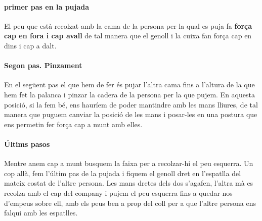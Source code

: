 \documentclass[a4paper]{article}
\begin{document}
\paragraph{primer pas en la pujada \\}
El peu que està recolzat amb la cama de la persona per la qual es puja fa \textbf{força cap en fora i cap avall} de tal manera que el genoll i la cuixa fan força cap en dins i cap a dalt.
\paragraph{Segon pas. Pinzament}
En el següent pas el que hem de fer \'es pujar l'altra cama fins a l'altura de la que hem fet la palanca i pinzar la cadera de la persona per la que pujem. En aquesta posició, si la fem b\'e, ens hauríem de poder mantindre amb les mans lliures, de tal manera que puguem canviar la posició de les mans i posar-les en una postura que ens permetin fer força cap a munt amb elles.

\paragraph{Últims pasos \\}
Mentre anem cap a munt busquem la faixa per a recolzar-hi el peu esquerra. Un cop allà, fem l'últim pas de la pujada i fiquem el genoll dret en l'espatlla del mateix costat de l'altre persona. Les mans dretes dels dos s'agafen, l'altra mà es recolza amb el cap del company i pujem el peu esquerra fins a quedar-nos d'empeus sobre ell, amb els peus ben a prop del coll per a que l'altre persona ens falqui amb les espatlles.

\end{document}
